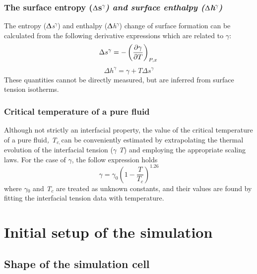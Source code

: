 \documentclass[9pt,bestpractices]{livecoms}
\begin{document}
\subsubsection{The surface entropy (${\Updelta}$s$^{{\gamma}}$\textit{) and surface enthalpy (${\Updelta}$h}$^{{\gamma}}$\textit{)}}

The entropy (${\Updelta}$\textit{s}$^{{\gamma}}$) and enthalpy
(${\Updelta}$\textit{h}$^{{\gamma}}$) change of surface formation can be
calculated from the following derivative expressions which are related to
{${\gamma}$}\citep{evans1992}: 
\begin{equation}
  \Delta s^{\gamma} =-\left(\frac{\partial\gamma}{\partial T}\right)_{P,x} \\
  \label{eq:6}
\end{equation}
\begin{equation}
  \Delta h^{\gamma} =\gamma+T\Delta s^{\gamma}
  \label{eq:7}
\end{equation}
These quantities cannot be directly measured, but are inferred from surface tension isotherms.

\subsubsection{Critical temperature of a pure fluid}

Although not strictly an interfacial property, the value of the critical
temperature of a pure fluid\textit{, T}$_{c, }$can be conveniently estimated by
extrapolating the thermal evolution of the interfacial tension (${\gamma}$
\textendash{} \textit{T}) and employing the appropriate scaling laws. For the
case of ${\gamma}$, the follow expression holds\citep{evans1992}
\begin{equation}
\gamma=\gamma_{0}\left(1-\frac{T}{T_{c}}\right)^{1.26}
\label{eq:8}
\end{equation}
where ${\gamma}$$_{0}$ and \textit{T}$_{c}$ are treated as unknown constants,
and their values are found by fitting the interfacial tension data with
temperature.

\section{Initial setup of the simulation}
\label{sec:setup}
\subsection{Shape of the simulation cell}
\end{document}
